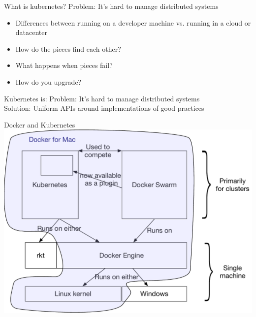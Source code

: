 \documentclass[xcolor=svgnames,17pt]{beamer}
\begin{document}
\begin{frame}
\tableofcontents[currentsection]
\end{frame}

\begin{frame}{What is kubernetes?}
Problem: It’s hard to manage distributed systems
\\[\baselineskip]
\pause
{}
\pause
\begin{itemize}
\item Differences between running on a developer machine vs. running in a
cloud or datacenter
\item How do the pieces find each other?
\item What happens when pieces fail?
\item How do you upgrade?
\end{itemize}
\end{frame}

\begin{frame}{Kubernetes is:}
Problem: It’s hard to manage distributed systems
\\[\baselineskip]
Solution: Uniform APIs around implementations of good practices
\end{frame}

\begin{frame}{Docker and Kubernetes}
\includegraphics[width=0.8\paperwidth,center]{docker-k8s-connection.pdf}
\end{frame}
\end{document}
